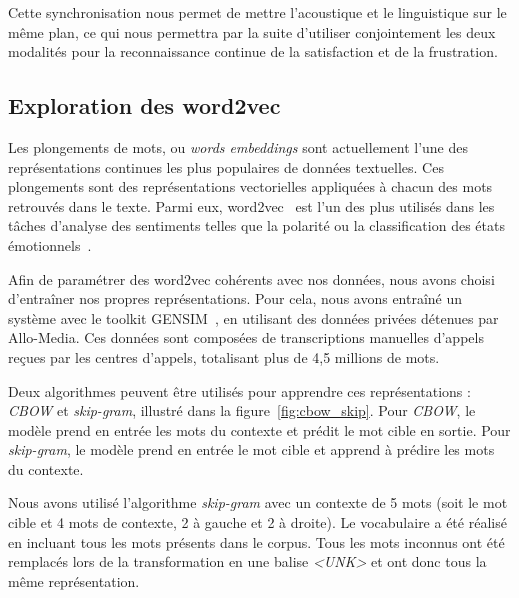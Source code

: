 Cette synchronisation nous permet de mettre l'acoustique et le linguistique sur le même plan, ce qui nous permettra par la suite d'utiliser conjointement les deux modalités pour la reconnaissance continue de la satisfaction et de la frustration.

\subsection{Exploration des word2vec}
Les plongements de mots, ou \textit{words embeddings} sont actuellement l'une des représentations continues les plus populaires de données textuelles. Ces plongements sont des représentations vectorielles appliquées à chacun des mots retrouvés dans le texte.
Parmi eux, word2vec~\cite{word2vec} est l'un des plus utilisés dans les tâches d'analyse des sentiments telles que la polarité ou la classification des états émotionnels~\cite{Dong2018}.

Afin de paramétrer des word2vec cohérents avec nos données, nous avons choisi d’entraîner nos propres représentations. Pour cela, nous avons entraîné un système avec le toolkit GENSIM~\cite{gensim}, en utilisant des données privées détenues par Allo-Media. Ces données sont composées de transcriptions manuelles d'appels reçues par les centres d'appels, totalisant plus de 4,5 millions de mots.

Deux algorithmes peuvent être utilisés pour apprendre ces représentations : \textit{CBOW} et \textit{skip-gram}, illustré dans la figure~\ref{fig:cbow_skip}. Pour \textit{CBOW}, le modèle prend en entrée les mots du contexte et prédit le mot cible en sortie. Pour \textit{skip-gram}, le modèle prend en entrée le mot cible et apprend à prédire les mots du contexte.



Nous avons utilisé l'algorithme \textit{skip-gram} avec un contexte de 5 mots (soit le mot cible et 4 mots de contexte, 2 à gauche et 2 à droite). Le vocabulaire a été réalisé en incluant tous les mots présents dans le corpus. Tous les mots inconnus ont été remplacés lors de la transformation en une balise \textit{<UNK>} et ont donc tous la même représentation.

